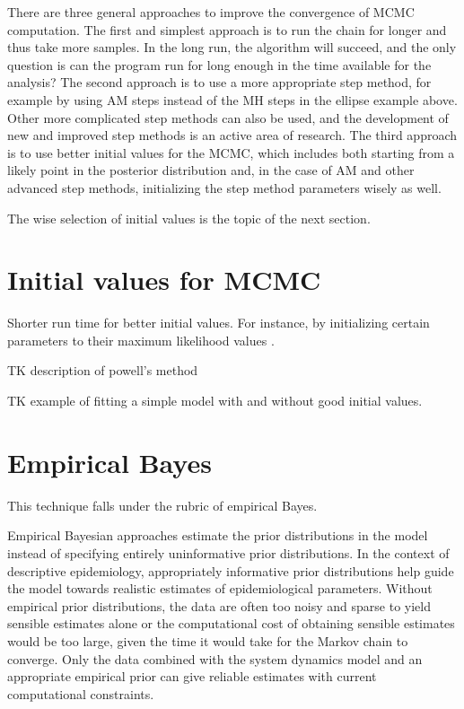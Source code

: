 There are three general approaches to improve the convergence of MCMC
computation. The first and simplest approach is to run the chain for
longer and thus take more samples.  In the long run, the algorithm
will succeed, and the only question is can the program run for long
enough in the time available for the analysis? The second approach is
to use a more appropriate step method, for example by using AM steps
instead of the MH steps in the ellipse example above.  Other more
complicated step methods can also be used, and the development of new
and improved step methods is an active area of research.  The third
approach is to use better initial values for the MCMC, which includes
both starting from a likely point in the posterior distribution and,
in the case of AM and other advanced step methods, initializing the
step method parameters wisely as well.

The wise selection of initial values is the topic of the next section.

\section{Initial values for MCMC}
Shorter run time for better initial values. For instance, by
initializing certain parameters to their maximum likelihood values
\cite{Bishop_Neural_1995}.

TK description of powell's method

TK example of fitting a simple model with and without good initial
values.

\section{Empirical Bayes}

This technique falls under the rubric of empirical Bayes.

Empirical Bayesian approaches estimate the prior distributions in the
model instead of specifying entirely uninformative prior
distributions. In the context of descriptive epidemiology,
appropriately informative prior distributions help guide the model
towards realistic estimates of epidemiological parameters. Without
empirical prior distributions, the data are often too noisy and sparse
to yield sensible estimates alone or the computational cost of
obtaining sensible estimates would be too large, given the time it
would take for the Markov chain to converge. Only the data combined
with the system dynamics model and an appropriate empirical prior can
give reliable estimates with current computational constraints.


